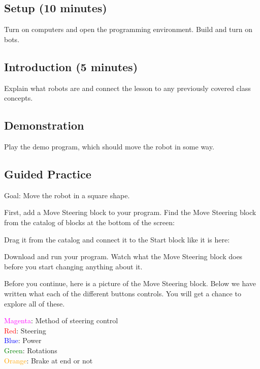 \documentclass{lessonplan}
\begin{document}
    \subsection{Setup (10 minutes)}
      Turn on computers and open the programming environment. Build and turn on bots.
    \subsection{Introduction (5 minutes)}
      Explain what robots are and connect the lesson to any previously covered class concepts.
    \subsection{Demonstration}
      Play the demo program, which should move the robot in some way.
    \subsection{Guided Practice}
    Goal: Move the robot in a square shape.

    First, add a Move Steering block to your program.
    Find the Move Steering block from the catalog of blocks at the bottom of the screen:
    

    Drag it from the catalog and connect it to the Start block like it is here:
    


    Download and run your program. Watch what the Move Steering block does before you start changing anything about it.
    \par
    Before you continue, here is a picture of the Move Steering block. Below we have written what each of the different buttons controls. You will get a chance to explore all of these.

    \textcolor{magenta}{Magenta}: Method of steering control \hfill \\
    \textcolor{red}{Red}: Steering  \hfill \\
    \textcolor{blue}{Blue}: Power  \hfill \\
    \textcolor{green}{Green}: Rotations  \hfill \\
    \textcolor{orange}{Orange}: Brake at end or not  \hfill \\
\end{document}
